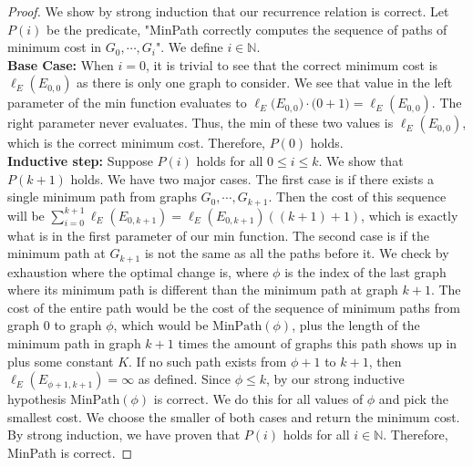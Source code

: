 \documentclass[11pt]{scrartcl}
\newcommand{\mpath}{\text{MinPath}}
\begin{document}
\begin{proof}
	We show by strong induction that our recurrence relation is correct. Let $P(i)$ be the predicate,
	"MinPath correctly computes the sequence of paths of minimum cost in $G_0, \cdots, G_i$".
	We define $i \in \mathbb{N}$. \\
	\textbf{Base Case:} When $i=0$, it is trivial to see that the correct minimum cost is
	$\ell_E(E_{0,0})$ as there is only one graph to consider. We see that value in the left
	parameter of the min function evaluates to $\ell_E\big(E_{0,0}\big) \cdot \big(0+1\big) = \ell_E(E_{0,0})$.
	The right parameter never evaluates. Thus, the min of these two values is $\ell_E(E_{0,0})$,
	which is the correct minimum cost. Therefore, $P(0)$ holds.\\
	\textbf{Inductive step:} Suppose $P(i)$ holds for all $0 \leq i \leq k$. We show that $P(k + 1)$ holds.
	We have two major cases. The first case is if there exists a single minimum path from graphs
	$G_0, \cdots, G_{k+1}$.  Then the cost of this sequence will be $\sum_{i=0}^{k+1} \ell_E(E_{0,k+1}) =
		\ell_E(E_{0,k+1})((k+1)+1)$, which is exactly what is in the first parameter of our min function.
	The second case is if the minimum path at $G_{k+1}$ is not the same as all the paths before it.
	We check by exhaustion where the optimal change is, where $\phi$ is the index of the last graph
	where its minimum path is different than the minimum path at graph $k+1$. The cost of the entire path
	would be the cost of the sequence of minimum paths from graph $0$ to graph $\phi$,
	which would be $\mpath(\phi)$,
	plus the length of the minimum path in graph $k+1$ times the amount of graphs this path
	shows up in plus some constant $K$. If no such path exists from $\phi + 1$ to $k + 1$, then
	$\ell_E(E_{\phi+1,k+1}) = \infty$ as defined. Since $\phi \leq k$, by our strong
	inductive hypothesis $\mpath(\phi)$ is correct. We do this for all values of $\phi$ 
	and pick the smallest cost. We choose the smaller of both cases and
	return the minimum cost. \\
	By strong induction, we have proven that $P(i)$ holds for all $i \in \mathbb{N}$.
	Therefore, MinPath is correct.
\end{proof}
\end{document}
